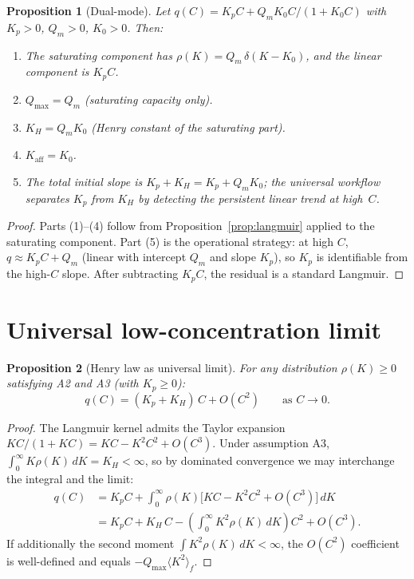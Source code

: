\documentclass[12pt]{article}
\newtheorem{proposition}{Proposition}
\begin{document}
\begin{proposition}[Dual-mode]
\label{prop:dualmode}
Let $q(C)=K_p C + Q_m K_0 C/(1+K_0 C)$ with $K_p>0$, $Q_m>0$,
$K_0>0$.  Then:
\begin{enumerate}[nosep]
  \item The saturating component has
        $\rho(K)=Q_m\,\delta(K-K_0)$,
        and the linear component is $K_p C$.
  \item $Q_{\max}=Q_m$ (saturating capacity only).
  \item $K_H=Q_m K_0$ (Henry constant of the saturating part).
  \item $K_{\mathrm{aff}}=K_0$.
  \item The total initial slope is $K_p + K_H = K_p + Q_m K_0$;
        the universal workflow separates $K_p$ from $K_H$ by
        detecting the persistent linear trend at high~$C$.
\end{enumerate}
\end{proposition}

\begin{proof}
Parts (1)--(4) follow from Proposition~\ref{prop:langmuir}
applied to the saturating component.  Part (5) is the operational
strategy: at high $C$, $q\approx K_p C + Q_m$ (linear with
intercept $Q_m$ and slope $K_p$), so $K_p$ is identifiable from
the high-$C$ slope.  After subtracting $K_p C$, the residual
is a standard Langmuir.
\end{proof}

\section{Universal low-concentration limit}
\label{sec:henry}

\begin{proposition}[Henry law as universal limit]
\label{prop:henry}
For any distribution $\rho(K)\ge 0$ satisfying A2 and A3 (with
$K_p\ge 0$):
\begin{equation}
  q(C) = (K_p + K_H)\,C + O(C^2) \qquad\text{as } C\to 0.
  \label{eq:henry_universal}
\end{equation}
\end{proposition}

\begin{proof}
The Langmuir kernel admits the Taylor expansion
$KC/(1+KC) = KC - K^2 C^2 + O(C^3)$.  Under assumption A3,
$\int_0^\infty K\rho(K)\,dK = K_H<\infty$, so by dominated
convergence we may interchange the integral and the limit:
\begin{align*}
  q(C) &= K_p C + \int_0^\infty \rho(K)\bigl[KC - K^2 C^2
          + O(C^3)\bigr]\,dK \\
       &= K_p C + K_H\,C - \left(\int_0^\infty K^2\rho(K)\,dK\right)C^2
          + O(C^3).
\end{align*}
If additionally the second moment
$\int K^2\rho(K)\,dK<\infty$, the $O(C^2)$ coefficient is
well-defined and equals $-Q_{\max}\langle K^2\rangle_f$.
\end{proof}
\end{document}
